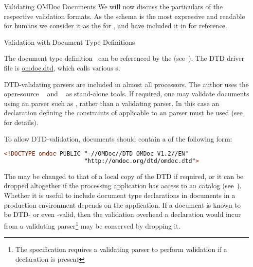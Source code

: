 \begin{tchapter}[id=validating]{Validating OMDoc Documents}
We will now discuss the particulars of the respective validation formats. As the
{\relaxng} schema is the most expressive and readable for humans we consider it as the
{} for {\omdoc}, and have included it in
{} for reference.

\begin{tsection}[id=validate-dtd]{Validation with Document Type Definitions}
  
  The {\omdoc} document type definition~\cite{OMDocDTD:URL} can be referenced by the
  {} {}
  (see~). The DTD driver file is \url{omdoc.dtd}, which calls various
  {s}.
  
  DTD-validating {\xml} parsers are included in almost all {\xml} processors. The author
  uses the open-source {\rxp}~\cite{Tobin:RXP} and
  {}~\cite{Veillard:libxml2} as stand-alone tools. If required, one may
  validate {\omdoc} documents using an {\sgml} parser such as {\nsgmls}, rather than a
  validating {\xml} parser. In this case an {\sgml} declaration defining the constraints
  of {\xml} applicable to an {\sgml} parser must be used (see~\cite{Clark:csx97} for
  details).

  To allow DTD-validation, {\omdoc} documents should contain a {} of the following form:
\begin{center}
\begin{lstlisting}[language=XML,index={DOCTYPE,omdoc}]
<!DOCTYPE omdoc PUBLIC "-//OMDoc//DTD OMDoc V1.2//EN"
                       "http://omdoc.org/dtd/omdoc.dtd">
\end{lstlisting}
\end{center}
The {} may be changed to that of a local copy of the DTD if required, or it
can be dropped altogether if the processing application has access to an {\xml}
catalog (see~).  Whether it is useful to include
document type declarations in documents in a production environment depends on the
application. If a document is known to be DTD- or even {\omdoc}-valid, then the validation
overhead a {} declaration would incur from a validating
parser\footnote{The {\xml} specification requires a validating parser to perform
  validation if a {} declaration is present} may be conserved by
dropping it.



\end{tsection}
\end{tchapter}
